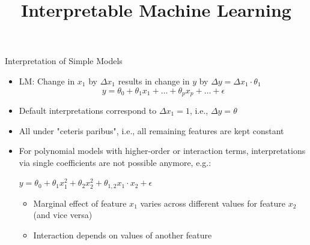 \documentclass[11pt,compress,t,notes=noshow, aspectratio=169, xcolor=table]{beamer}
\title{Interpretable Machine Learning}
\date{}
\begin{document}
\newcommand{\titlefigure}{figure_man/me_movement}
\newcommand{\learninggoals}{
\item Why parameter-based interpretations are not always possible for parametric models
\item How marginal effects can be used in such cases
\item Drawbacks of marginal effects
\item Model-agnostic applicability}


\begin{frame}{Interpretation of Simple Models}

\begin{itemize}
\itemsep1em
\item LM: Change in $x_1$ by $\Delta x_1$ results in change in $y$ by $\Delta y = \Delta x_1 \cdot \theta_1$
\begin{equation*}
y = \theta_0 + \theta_1 x_1 + \dots + \theta_p x_p + \dots + \epsilon
\end{equation*}
\item Default interpretations correspond to $\Delta x_1 = 1$, i.e., $\Delta y = \theta$
\item All under "ceteris paribus", i.e., all remaining features are kept constant
\item For polynomial models with higher-order or interaction terms, interpretations via single coefficients are not possible anymore, e.g.:

\medskip

\centerline{$y = \theta_0 + \theta_{1} x_1^2 + \theta_{2} x_2^2 + \theta_{1, 2} x_1 \cdot x_2 + \epsilon$}

\medskip

\begin{itemize}
%
\item Marginal effect of feature $x_1$ varies across different values for feature $x_2$ (and vice versa)
\item Interaction depends on values of another feature
\end{itemize}
\end{itemize}
\end{frame}
\end{document}
